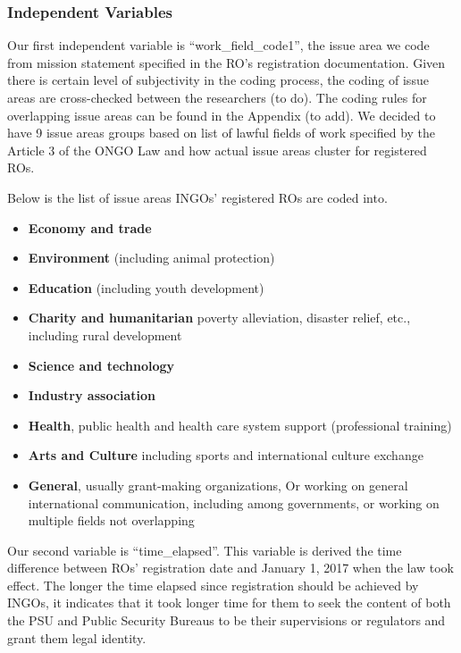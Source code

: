 \documentclass[
]{article}
\providecommand{\tightlist}{%
  \setlength{\itemsep}{0pt}\setlength{\parskip}{0pt}}\usepackage{longtable,booktabs,array}
\begin{document}
\hypertarget{independent-variables}{%
\subsubsection{Independent Variables}\label{independent-variables}}

Our first independent variable is ``work\_field\_code1'', the issue area
we code from mission statement specified in the RO's registration
documentation. Given there is certain level of subjectivity in the
coding process, the coding of issue areas are cross-checked between the
researchers (to do). The coding rules for overlapping issue areas can be
found in the Appendix (to add). We decided to have 9 issue areas groups
based on list of lawful fields of work specified by the Article 3 of the
ONGO Law and how actual issue areas cluster for registered ROs.

Below is the list of issue areas INGOs' registered ROs are coded into.

\begin{itemize}
\tightlist
\item
  \textbf{Economy and trade}
\item
  \textbf{Environment} (including animal protection)
\item
  \textbf{Education} (including youth development)
\item
  \textbf{Charity and humanitarian} poverty alleviation, disaster
  relief, etc., including rural development
\item
  \textbf{Science and technology}
\item
  \textbf{Industry association}
\item
  \textbf{Health}, public health and health care system support
  (professional training)
\item
  \textbf{Arts and Culture} including sports and international culture
  exchange
\item
  \textbf{General}, usually grant-making organizations, Or working on
  general international communication, including among governments, or
  working on multiple fields not overlapping
\end{itemize}

Our second variable is ``time\_elapsed''. This variable is derived the
time difference between ROs' registration date and January 1, 2017 when
the law took effect. The longer the time elapsed since registration
should be achieved by INGOs, it indicates that it took longer time for
them to seek the content of both the PSU and Public Security Bureaus to
be their supervisions or regulators and grant them legal identity.
\end{document}
